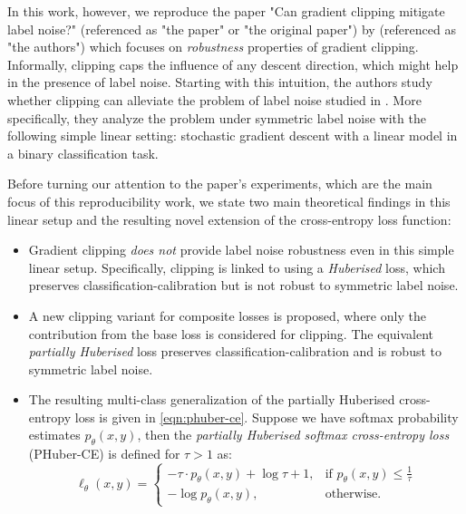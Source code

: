 In this work, however, we reproduce the paper "Can gradient clipping mitigate label noise?" (referenced as "the paper" or "the original paper") by \citet{menon_can_2019} (referenced as "the authors") which focuses on \emph{robustness} properties of gradient clipping. Informally, clipping caps the influence of any descent direction, which might help in the presence of label noise. Starting with this intuition, the authors study whether clipping can alleviate the problem of label noise studied in \citet{ekholm1982model, menon2015learning, zhang_generalized_2018}.
More specifically, they analyze the problem under symmetric label noise with the following simple linear setting: stochastic gradient descent with a linear model in a binary classification task.

Before turning our attention to the paper's experiments, which are the main focus of this reproducibility work, we state two main theoretical findings in this linear setup and the resulting novel extension of the cross-entropy loss function:
\begin{itemize}

\item Gradient clipping \emph{does not} provide label noise robustness even in this simple linear setup.
Specifically, clipping is linked to using a \textit{Huberised} loss, which preserves classification-calibration but is not robust to symmetric label noise.

\item A new clipping variant for composite losses is proposed, where only the contribution from the base loss is considered for clipping.
The equivalent \textit{partially Huberised} loss preserves classification-calibration and is robust to symmetric label noise.

\item The resulting multi-class generalization of the partially Huberised  cross-entropy loss is given in \autoref{eqn:phuber-ce}. Suppose we have softmax probability estimates $p_\theta(x,y)$, then the \emph{partially Huberised softmax cross-entropy loss} (PHuber-CE) is defined for $\tau > 1$ as:
\begin{equation}
\label{eqn:phuber-ce}
\ell_\theta(x,y)= 
\begin{cases}
    - \tau \cdot p_\theta(x,y) + \log \tau + 1,& \text{if } p_\theta(x,y) \leq \frac {1}{\tau}\\
    -\log p_\theta(x,y),              & \text{otherwise.}
\end{cases}
\end{equation}

\end{itemize}

